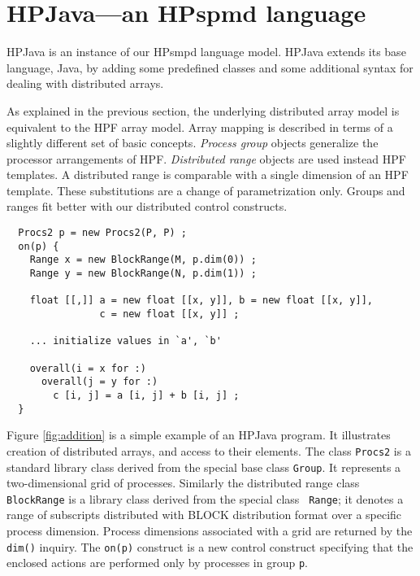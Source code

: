 \section{HPJava---an HPspmd language\label{sec:HPJava}}

HPJava \cite{HPJava} is an instance of our HPsmpd language
model.  HPJava extends its base language, Java, by adding some
predefined classes and some additional syntax for dealing with
distributed arrays.

As explained in the previous section, the underlying distributed array
model is equivalent to the HPF array model.  Array mapping
is described in terms of a slightly different set of basic
concepts.  {\em Process group} objects generalize the processor
arrangements of HPF.  {\em Distributed range} objects are used
instead HPF templates.  A distributed range is comparable with a single
dimension of an HPF template.  These substitutions are a change
of parametrization only.  Groups and ranges fit better with our
distributed control constructs.

\begin{figure*}[tbp]
\small
\begin{verbatim}
  Procs2 p = new Procs2(P, P) ;
  on(p) {
    Range x = new BlockRange(M, p.dim(0)) ;
    Range y = new BlockRange(N, p.dim(1)) ;

    float [[,]] a = new float [[x, y]], b = new float [[x, y]],
                c = new float [[x, y]] ;

    ... initialize values in `a', `b'

    overall(i = x for :)
      overall(j = y for :)
        c [i, j] = a [i, j] + b [i, j] ;
  }
\end{verbatim}
\normalsize
\caption{A parallel matrix addition.\label{fig:addition}}
\end{figure*}

Figure \ref{fig:addition} is a simple example of an HPJava program.  It
illustrates creation of distributed arrays, and access to their
elements.  The class {\tt Procs2} is a standard library class derived
from the special base class {\tt Group}.  It represents a
two-dimensional grid of processes.  Similarly the distributed range class
{\tt BlockRange} is a library class derived from the special class {\tt
Range}; it denotes a range of subscripts distributed with
BLOCK distribution format over a specific process dimension.  Process
dimensions associated with a grid are returned by the {\tt dim()}
inquiry.
The {\tt on(p)} construct is a new control construct specifying that
the enclosed actions are performed only by processes in group {\tt p}.

